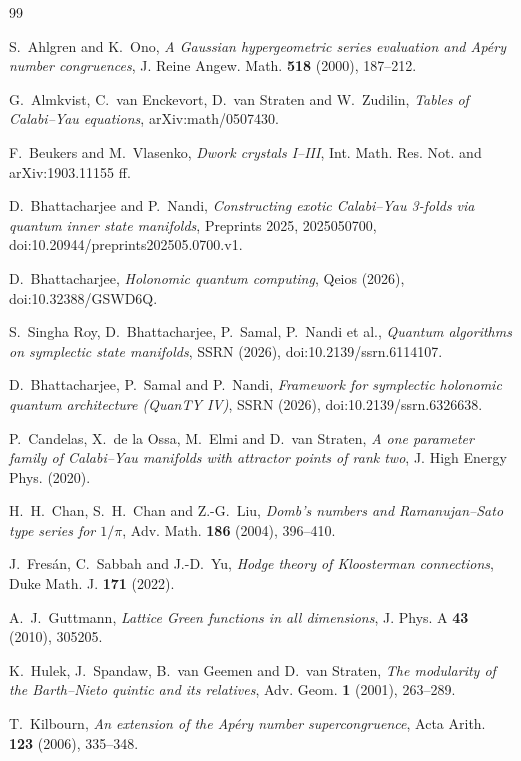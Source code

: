 \documentclass[11pt]{amsart}
\theoremstyle{definition}
\begin{document}
\begin{thebibliography}{99}

 S.~Ahlgren and K.~Ono, \emph{A Gaussian hypergeometric series evaluation and Ap\'ery number congruences}, J. Reine Angew. Math. \textbf{518} (2000), 187--212.

 G.~Almkvist, C.~van Enckevort, D.~van Straten and W.~Zudilin, \emph{Tables of Calabi--Yau equations}, arXiv:math/0507430.

 F.~Beukers and M.~Vlasenko, \emph{Dwork crystals I--III}, Int. Math. Res. Not. and arXiv:1903.11155 ff.

 D.~Bhattacharjee and P.~Nandi, \emph{Constructing exotic Calabi--Yau 3-folds via quantum inner state manifolds}, Preprints 2025, 2025050700, doi:10.20944/preprints202505.0700.v1.

 D.~Bhattacharjee, \emph{Holonomic quantum computing}, Qeios (2026), doi:10.32388/GSWD6Q.

 S.~Singha Roy, D.~Bhattacharjee, P.~Samal, P.~Nandi et al., \emph{Quantum algorithms on symplectic state manifolds}, SSRN (2026), doi:10.2139/ssrn.6114107.

 D.~Bhattacharjee, P.~Samal and P.~Nandi, \emph{Framework for symplectic holonomic quantum architecture (QuanTY IV)}, SSRN (2026), doi:10.2139/ssrn.6326638.

 P.~Candelas, X.~de la Ossa, M.~Elmi and D.~van Straten, \emph{A one parameter family of Calabi--Yau manifolds with attractor points of rank two}, J. High Energy Phys. (2020).

 H.~H.~Chan, S.~H.~Chan and Z.-G.~Liu, \emph{Domb's numbers and Ramanujan--Sato type series for $1/\pi$}, Adv. Math. \textbf{186} (2004), 396--410.

 J.~Fres\'an, C.~Sabbah and J.-D.~Yu, \emph{Hodge theory of Kloosterman connections}, Duke Math. J. \textbf{171} (2022).

 A.~J.~Guttmann, \emph{Lattice Green functions in all dimensions}, J. Phys. A \textbf{43} (2010), 305205.

 K.~Hulek, J.~Spandaw, B.~van Geemen and D.~van Straten, \emph{The modularity of the Barth--Nieto quintic and its relatives}, Adv. Geom. \textbf{1} (2001), 263--289.

 T.~Kilbourn, \emph{An extension of the Ap\'ery number supercongruence}, Acta Arith. \textbf{123} (2006), 335--348.


\end{thebibliography}
\end{document}
